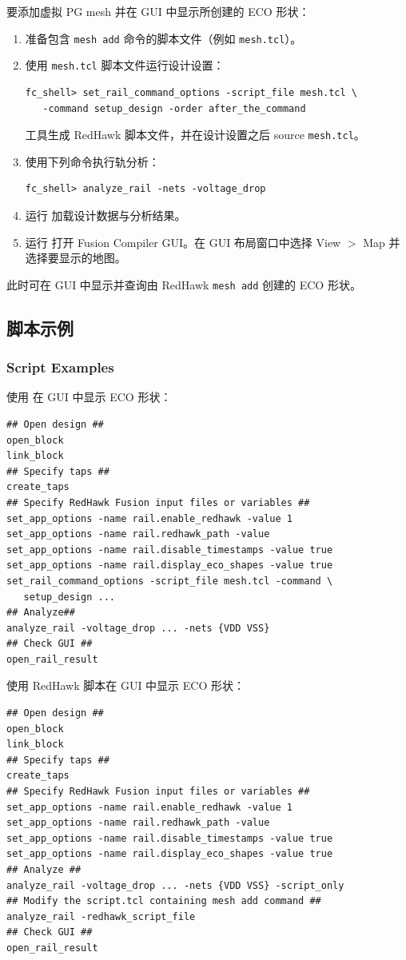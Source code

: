 要添加虚拟 PG mesh 并在 GUI 中显示所创建的 ECO 形状：
\begin{enumerate}
  \item 准备包含 \texttt{mesh add} 命令的脚本文件（例如 \texttt{mesh.tcl}）。
  \item 使用 \texttt{mesh.tcl} 脚本文件运行设计设置：
\begin{lstlisting}
fc_shell> set_rail_command_options -script_file mesh.tcl \
   -command setup_design -order after_the_command
\end{lstlisting}
工具生成 RedHawk 脚本文件，并在设计设置之后 source \texttt{mesh.tcl}。
  \item 使用下列命令执行轨分析：
\begin{lstlisting}
fc_shell> analyze_rail -nets -voltage_drop
\end{lstlisting}
  \item 运行  加载设计数据与分析结果。
  \item 运行  打开 Fusion Compiler GUI。在 GUI 布局窗口中选择 View $>$ Map 并选择要显示的地图。
\end{enumerate}

此时可在 GUI 中显示并查询由 RedHawk \texttt{mesh add} 创建的 ECO 形状。

\subsection{脚本示例}
\subsubsection*{Script Examples}

使用  在 GUI 中显示 ECO 形状：
\begin{lstlisting}
## Open design ##
open_block
link_block
## Specify taps ##
create_taps
## Specify RedHawk Fusion input files or variables ##
set_app_options -name rail.enable_redhawk -value 1
set_app_options -name rail.redhawk_path -value
set_app_options -name rail.disable_timestamps -value true
set_app_options -name rail.display_eco_shapes -value true
set_rail_command_options -script_file mesh.tcl -command \
   setup_design ...
## Analyze##
analyze_rail -voltage_drop ... -nets {VDD VSS}
## Check GUI ##
open_rail_result
\end{lstlisting}

使用 RedHawk 脚本在 GUI 中显示 ECO 形状：
\begin{lstlisting}
## Open design ##
open_block
link_block
## Specify taps ##
create_taps
## Specify RedHawk Fusion input files or variables ##
set_app_options -name rail.enable_redhawk -value 1
set_app_options -name rail.redhawk_path -value
set_app_options -name rail.disable_timestamps -value true
set_app_options -name rail.display_eco_shapes -value true
## Analyze ##
analyze_rail -voltage_drop ... -nets {VDD VSS} -script_only
## Modify the script.tcl containing mesh add command ##
analyze_rail -redhawk_script_file
## Check GUI ##
open_rail_result
\end{lstlisting}


